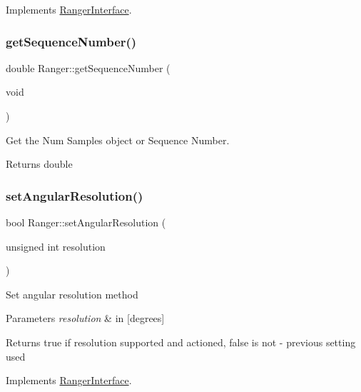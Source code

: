 Implements \hyperlink{classRangerInterface_a7f6db3f603d997ad6c5aa5c7778261f4}{Ranger\+Interface}.

\mbox{\label{classRanger_a1cad662a106b1df8729846ea256f40c8}} 
\subsubsection{\texorpdfstring{get\+Sequence\+Number()}{getSequenceNumber()}}
{\footnotesize\ttfamily double Ranger\+::get\+Sequence\+Number (\begin{DoxyParamCaption}\item[{void}]{ }\end{DoxyParamCaption})}



Get the Num Samples object or Sequence Number. 

\begin{DoxyReturn}{Returns}
double 
\end{DoxyReturn}
\mbox{\label{classRanger_a3dc62dcba54eefbd7a0f08cbf97d87dc}} 
\subsubsection{\texorpdfstring{set\+Angular\+Resolution()}{setAngularResolution()}}
{\footnotesize\ttfamily bool Ranger\+::set\+Angular\+Resolution (\begin{DoxyParamCaption}\item[{unsigned int}]{resolution }\end{DoxyParamCaption})\hspace{0.3cm}{\ttfamily [virtual]}}

Set angular resolution method 
\begin{DoxyParams}{Parameters}
{\em resolution} & in \mbox{[}degrees\mbox{]} \\
\hline
\end{DoxyParams}
\begin{DoxyReturn}{Returns}
true if resolution supported and actioned, false is not -\/ previous setting used 
\end{DoxyReturn}


Implements \hyperlink{classRangerInterface_aecffc9bbb58379da741c18326b9e41db}{Ranger\+Interface}.

